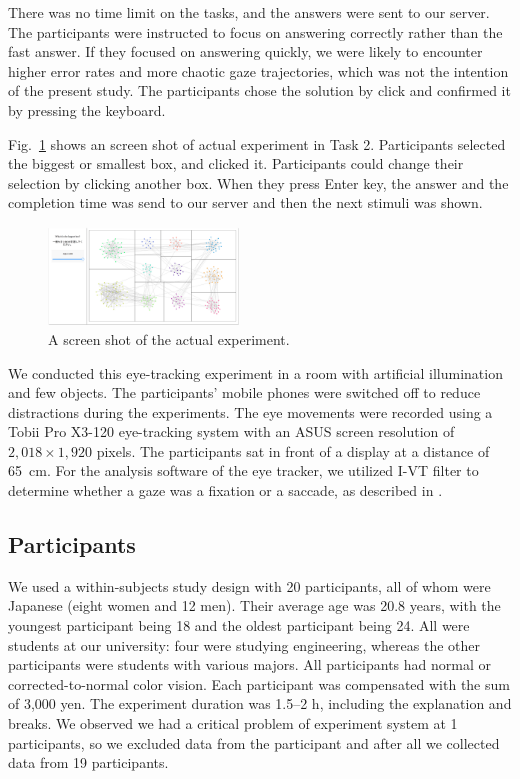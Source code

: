 \documentclass{vgtc}                          %
\begin{document}
There was no time limit on the tasks, and the answers were sent to our server.
The participants were instructed to focus on answering correctly rather than the fast answer.
If they focused on answering quickly, we were likely to encounter higher error rates and more chaotic gaze trajectories, which was not the intention of the present study.
The participants chose the solution by click and confirmed it by pressing the keyboard.

Fig.~\ref{screenShot} shows an screen shot of actual experiment in Task 2. Participants selected the biggest or smallest box, and clicked it. Participants could change their selection by clicking another box. When they press Enter key, the answer and the completion time was send to our server and then the next stimuli was shown.

\begin{figure}[h]
  \begin{center}
    \includegraphics[width=0.45\textwidth]{pictures/screenshot.png}
    \caption{A screen shot of the actual experiment.}
    \label{screenShot}
  \end{center}
\end{figure}

We conducted this eye-tracking experiment in a room with artificial illumination and few objects.
The participants' mobile phones were switched off to reduce distractions during the experiments.
The eye movements were recorded using a Tobii Pro X3-120 eye-tracking system with an ASUS screen resolution of $2,018 \times 1,920$ pixels.
The participants sat in front of a display at a distance of 65~cm.
For the analysis software of the eye tracker, we utilized I-VT filter to determine whether a gaze was a fixation or a saccade, as described in \cite{olsen2012tobii}.

\subsection{Participants}

We used a within-subjects study design with 20 participants, all of whom were Japanese (eight women and 12 men).
Their average age was 20.8 years, with the youngest participant being 18 and the oldest participant being 24.
All were students at our university: four were studying engineering, whereas the other participants were students with various majors.
All participants had normal or corrected-to-normal color vision.
Each participant was compensated with the sum of 3,000 yen.
The experiment duration was 1.5--2 h, including the explanation and breaks.
We observed we had a critical problem of experiment system at 1 participants, so we excluded data from the participant and after all we collected data from 19 participants.
\end{document}
